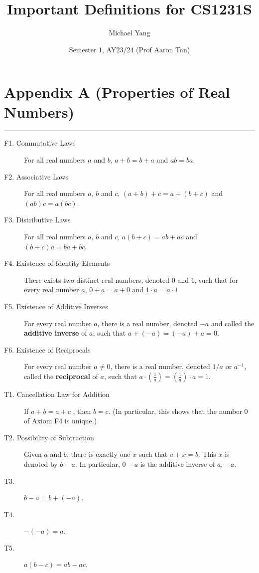 \documentclass{article}
\title{Important Definitions for CS1231S}
\author{Michael Yang}
\date{Semester 1, AY23/24 (Prof Aaron Tan)}
\begin{document}
\maketitle
\newpage


\section*{Appendix A (Properties of Real Numbers)}
\hrule
\begin{multicols*}{2}
    \begin{description}
        \item[F1. Commutative Laws]For all real numbers $a$ and $b$, $a + b = b + a$ and $ab = ba$.
        \item[F2. Associative Laws]For all real numbers $a$, $b$ and $c$, $(a+b) + c = a + (b + c)$ and $(ab)c = a(bc)$.
        \item[F3. Distributive Laws]For all real numbers $a$, $b$ and $c$, $a(b + c) = ab + ac$ and $(b+c)a = ba + bc$.
        \item[F4. Existence of Identity Elements]There exists two distinct real numbers, denoted $0$ and $1$, such that for every real number $a$, $0 + a = a + 0$ and $1 \cdot a = a \cdot 1$.
        \item[F5. Existence of Additive Inverses]For every real number $a$, there is a real number, denoted $-a$ and called the \textbf{additive inverse} of $a$, such that $a + (-a) = (-a) + a = 0$.
        \item[F6. Existence of Reciprocals]For every real number $a\neq0$, there is a real number, denoted $1/a$ or $a^{-1}$, called the \textbf{reciprocal} of $a$, such that $a \cdot (\frac{1}{a}) = (\frac{1}{a})\cdot a = 1$.
        \item[T1. Cancellation Law for Addition]If $a + b = a + c$ , then $b = c$. (In particular, this shows that the number 0 of Axiom F4 is unique.)
        \item[T2. Possibility of Subtraction]Given $a$ and $b$, there is exactly one $x$ such that $a+x=b$. This $x$ is denoted by $b-a$. In particular, $0-a$ is the additive inverse of $a$, $-a$.
        \item[T3.]$b-a=b+(-a)$.
        \item[T4.]$-(-a)=a$.
        \item[T5.]$a(b-c)=ab-ac$.

\end{description}
\end{multicols*}
\end{document}

